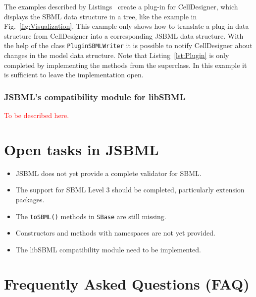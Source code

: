 \documentclass[
  BCOR12mm,
  letterpaper,
  11pt,
  headsepline,
  pointlessnumbers,
  tablecaptionabove,
  onelinecaption,
  headinclude,
  appendixprefix,
  idxtotoc,
  bibtotoc,
  twoside,
  titlepage
]{scrartcl}
\begin{document}
The examples described by Listings~
create a plug-in for CellDesigner, which displays the SBML data structure
in a tree, like the example in Fig.~\vref{fig:Visualization}. This example only
shows how to translate a plug-in data structure
from CellDesigner into a corresponding JSBML data structure. With the help of
the class \texttt{PluginSBMLWriter} it is possible to notify CellDesigner about
changes in the model data structure. Note that Listing~\vref{lst:Plugin} is only
completed by implementing the methods from the superclass. In this example it
is sufficient to leave the implementation open.


\subsubsection{JSBML's compatibility module for libSBML}

\textcolor{red}{To be described here.}


\section{Open tasks in JSBML}

\begin{itemize}
\item JSBML does not yet provide a complete validator for SBML.
\item The support for SBML Level 3 should be completed, particularly extension packages.
\item The \texttt{toSBML()}
methods in \texttt{SBase} are still missing.
\item Constructors and methods with namespaces are not yet provided.
\item The libSBML compatibility module
need to be implemented.
\end{itemize}

\appendix

\section{Frequently Asked Questions (FAQ)}
\end{document}
